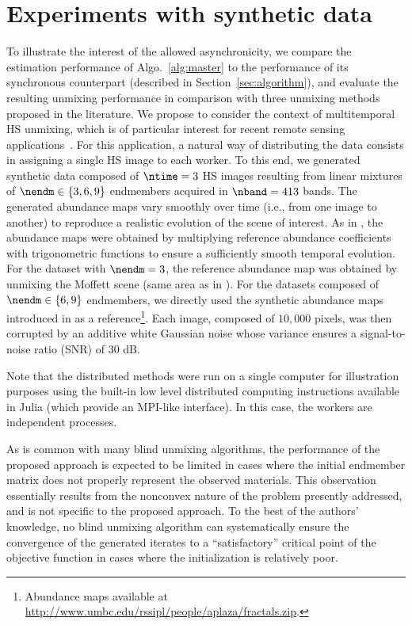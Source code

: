 \documentclass[journal,final,letterpaper,twoside,twocolumn]{IEEEtran}
\begin{document}
\section{Experiments with synthetic data} \label{sec:exp}

To illustrate the interest of the allowed asynchronicity, we compare the estimation performance of Algo.~\ref{alg:master} to the performance of its synchronous counterpart (described in Section~\ref{sec:algorithm}), and evaluate the resulting unmixing performance in comparison with three unmixing methods proposed in the literature. We propose to consider the context of multitemporal HS unmixing, which is of particular interest for recent remote sensing applications~\cite{Henrot2016,Thouvenin2015b,Yokoya2017}. For this application, a natural way of distributing the data consists in assigning a single HS image to each worker.
%
To this end, we generated synthetic data composed of $\ntime = 3$ HS images resulting from linear mixtures of $\nendm \in \left\{3, 6, 9\right\}$ endmembers acquired in $\nband = 413$ bands. The generated abundance maps vary smoothly over time (i.e., from one image to another) to reproduce a realistic evolution of the scene of interest. As in \cite[Section V]{Thouvenin2018}, the abundance maps were obtained by multiplying reference abundance coefficients with trigonometric functions to ensure a sufficiently smooth temporal evolution. For the dataset with $\nendm = 3$, the reference abundance map was obtained by unmixing the Moffett scene (same area as in \cite{Dobigeon2009}). For the datasets composed of $\nendm \in \{6, 9\}$ endmembers, we directly used the synthetic abundance maps introduced in \cite{Plaza2011} as a reference\footnote{Abundance maps available at \url{http://www.umbc.edu/rssipl/people/aplaza/fractals.zip}.}. Each image, composed of $10,000$ pixels, was then corrupted by an additive white Gaussian noise whose variance ensures a signal-to-noise ratio (SNR) of $30$ dB.

Note that the distributed methods were run on a single computer for illustration purposes using the built-in low level distributed computing instructions available in Julia \cite{Bezanson2017} (which provide an MPI-like interface). In this case, the workers are independent processes. 

As is common with many blind unmixing algorithms, the performance of the proposed approach is expected to be limited in cases where the initial endmember matrix does not properly represent the observed materials. This observation essentially results from the nonconvex nature of the problem presently addressed, and is not specific to the proposed approach. To the best of the authors' knowledge, no blind unmixing algorithm can systematically ensure the convergence of the generated iterates to a ``satisfactory'' critical point of the objective function in cases where the initialization is relatively poor.
\end{document}
